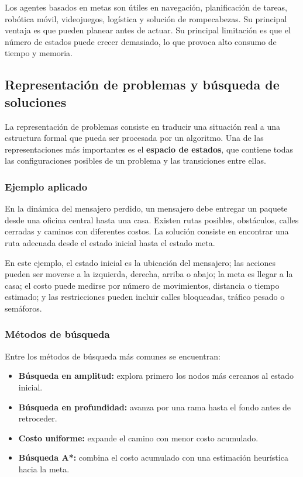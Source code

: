 Los agentes basados en metas son útiles en navegación, planificación de tareas, robótica móvil, videojuegos, logística y solución de rompecabezas. Su principal ventaja es que pueden planear antes de actuar. Su principal limitación es que el número de estados puede crecer demasiado, lo que provoca alto consumo de tiempo y memoria.

\subsection{Representación de problemas y búsqueda de soluciones}

La representación de problemas consiste en traducir una situación real a una estructura formal que pueda ser procesada por un algoritmo. Una de las representaciones más importantes es el \textbf{espacio de estados}, que contiene todas las configuraciones posibles de un problema y las transiciones entre ellas.

\subsubsection{Ejemplo aplicado}

En la dinámica del mensajero perdido, un mensajero debe entregar un paquete desde una oficina central hasta una casa. Existen rutas posibles, obstáculos, calles cerradas y caminos con diferentes costos. La solución consiste en encontrar una ruta adecuada desde el estado inicial hasta el estado meta.

En este ejemplo, el estado inicial es la ubicación del mensajero; las acciones pueden ser moverse a la izquierda, derecha, arriba o abajo; la meta es llegar a la casa; el costo puede medirse por número de movimientos, distancia o tiempo estimado; y las restricciones pueden incluir calles bloqueadas, tráfico pesado o semáforos.

\subsubsection{Métodos de búsqueda}

Entre los métodos de búsqueda más comunes se encuentran:

\begin{itemize}
    \item \textbf{Búsqueda en amplitud:} explora primero los nodos más cercanos al estado inicial.
    \item \textbf{Búsqueda en profundidad:} avanza por una rama hasta el fondo antes de retroceder.
    \item \textbf{Costo uniforme:} expande el camino con menor costo acumulado.
    \item \textbf{Búsqueda A*:} combina el costo acumulado con una estimación heurística hacia la meta.
\end{itemize}

